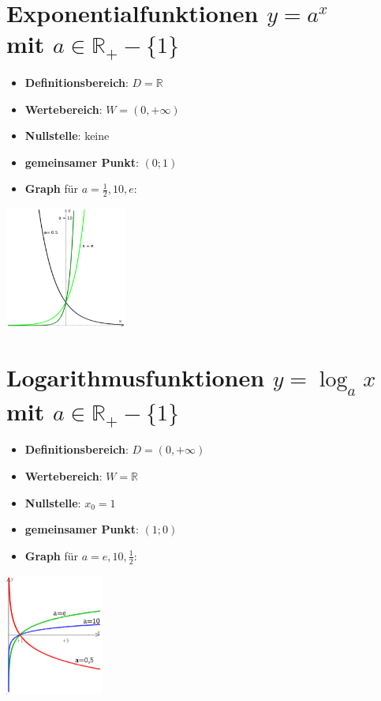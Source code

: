 \newpage
\section*{Exponentialfunktionen $y = a^x$ \\ mit $a \in \mathbb{R_+}-\{1\}$}
\begin{minipage}{.5\textwidth}
\begin{itemize}
	\item \textbf{Definitionsbereich}: $ D = \mathbb{R} $
	\item \textbf{Wertebereich}: $ W = (0, + \infty) $
	\item \textbf{Nullstelle}: keine
	\item \textbf{gemeinsamer Punkt}: $(0;1)$
	\item \textbf{Graph} für $a = \tfrac{1}{2}, 10, e$:
\end{itemize} 
\end{minipage}
\begin{minipage}{.5\textwidth}
\includegraphics[height=4cm]{img/exp.pdf} 
\end{minipage}

\section*{Logarithmusfunktionen $y = \log_a x$ \\ mit $a \in
\mathbb{R_+}-\{1\}$}

\begin{minipage}{.5\textwidth}
\begin{itemize}
	\item \textbf{Definitionsbereich}: $ D = (0, + \infty) $
	\item \textbf{Wertebereich}: $ W = \mathbb{R} $
	\item \textbf{Nullstelle}: $ x_0 = 1 $
	\item \textbf{gemeinsamer Punkt}: $(1;0)$
	\item \textbf{Graph} für $a= e, 10, \tfrac{1}{2}$:
\end{itemize}
\end{minipage}
\begin{minipage}{.5\textwidth}
\includegraphics[height=4cm]{img/log.pdf}
\end{minipage}



